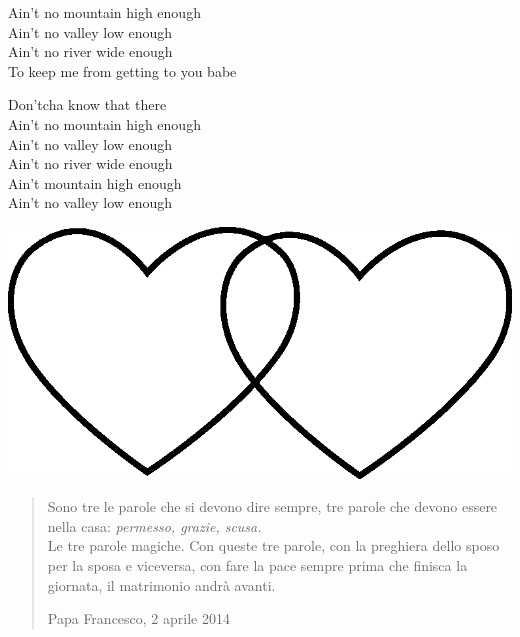 \documentclass[11pt]{book}
\begin{document}
\begin{canzone}
\begin{ritornello}
Ain't no mountain high enough\\
Ain't no valley low enough\\
Ain't no river wide enough\\
To keep me from getting to you babe
\end{ritornello}

Don'tcha know that there\\
Ain't no mountain high enough\\
Ain't no valley low enough\\
Ain't no river wide enough\\
Ain't mountain high enough\\
Ain't no valley low enough
\end{canzone}
\vfill
\begin{center}
\includegraphics[scale=0.1]{img/cuori_venn.eps}\\
\end{center}
\begin{quotation}\small{}
Sono tre le parole che si devono dire sempre, tre parole che devono essere nella casa: \emph{permesso, grazie, scusa.}\\Le tre parole magiche. Con queste tre parole, con la preghiera dello sposo per la sposa e viceversa, con fare la pace sempre prima che finisca la giornata, il matrimonio andrà avanti.
\begin{flushright}Papa Francesco, 2 aprile 2014\end{flushright}
\end{quotation}
\end{document}
